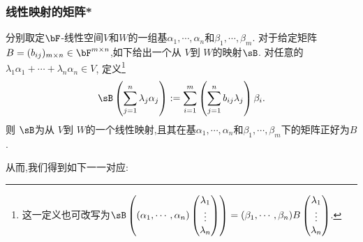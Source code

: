 \begin{frame}\frametitle{线性映射的矩阵*}
\begin{example}[从矩阵出发构造线性映射]
分别取定$\bF$-线性空间$V$和$W$的一组基$\alpha_1,\cdots,\alpha_n$和$\beta_1,\cdots,\beta_m$.
\pp
对于给定矩阵$B=(b_{ij})_{m\times n}\in \bF^{m\times n}$,如下给出一个从 $V$到 $W$的映射$\sB$.
\pp
对任意的$\lambda_1\alpha_1+\cdots+\lambda_n\alpha_n\in V$, 定义\footnote{这一定义也可改写为$\sB\left((\alpha_1,\cdots,\alpha_n)\begin{pmatrix}\lambda_1\\\vdots\\\lambda_n\\\end{pmatrix}\right) = (\beta_1,\cdots,\beta_n)B\begin{pmatrix}\lambda_1\\\vdots\\\lambda_n\\\end{pmatrix}$.}
\[\sB\left(\sum_{j=1}^n\lambda_j\alpha_j\right) := \sum_{i=1}^{m} \left(\sum_{j=1}^{n} b_{ij}\lambda_j\right) \beta_i.\]
\pp
则 $\sB$为从 $V$到 $W$的一个线性映射,且其在基$\alpha_1,\cdots,\alpha_n$和$\beta_1,\cdots,\beta_m$下的矩阵正好为$B$.
\end{example}
\pp
从而,我们得到如下一一对应:
\begin{center}
\end{center}
\end{frame}





